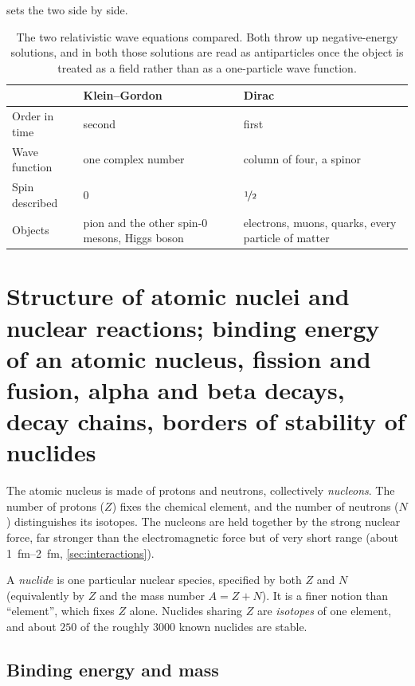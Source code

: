      sets the two side by side.

    \begin{table}[H]
        \centering
        \renewcommand{\arraystretch}{1.25}
        \begin{tabularx}{\linewidth}{lLL}
            \hline
             & \textbf{Klein--Gordon} & \textbf{Dirac} \\
            \hline
            Order in time & \rule{0pt}{2.6ex}second & first \\
            Wave function & one complex number & column of four, a spinor \\
            Spin described & $0$ & $\nicefrac{1}{2}$ \\
            Objects & pion and the other spin-0 mesons, Higgs boson & electrons, muons, quarks, every particle of matter \\
            \hline
        \end{tabularx}
        \caption{The two relativistic wave equations compared. Both throw up negative-energy solutions, and in both those solutions are read as antiparticles once the object is treated as a field rather than as a one-particle wave function.}
        \label{tab:relativistic-eqns}
    \end{table}

\section{Structure of atomic nuclei and nuclear reactions; binding energy of an atomic nucleus, fission and fusion, alpha and beta decays, decay chains, borders of stability of nuclides}
\label{sec:nuclei}

    The atomic nucleus is made of protons and neutrons, collectively \emph{nucleons}. The number of protons ($Z$) fixes the chemical element, and the number of neutrons ($N$) distinguishes its isotopes. The nucleons are held together by the strong nuclear force, far stronger than the electromagnetic force but of very short range (about \qtyrange{1}{2}{\femto\metre}, \cref{sec:interactions}).

    A \emph{nuclide} is one particular nuclear species, specified by both $Z$ and $N$ (equivalently by $Z$ and the mass number $A = Z+N$). It is a finer notion than \enquote{element}, which fixes $Z$ alone. Nuclides sharing $Z$ are \emph{isotopes} of one element, and about $250$ of the roughly $3000$ known nuclides are stable.

    \subsection{Binding energy and mass}

